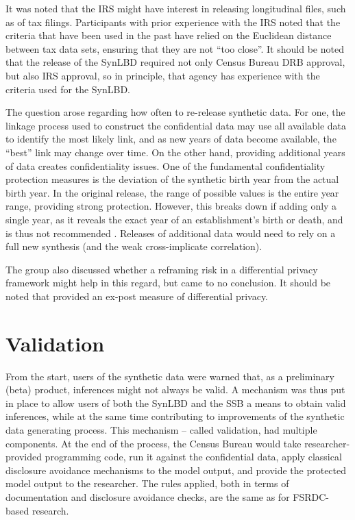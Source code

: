 \documentclass[letterpaper,12pt]{article}
\begin{document}
It was noted that the \ac{IRS} might have interest in releasing longitudinal files, such as of tax filings. Participants with prior experience with the \ac{IRS} noted that the criteria that have been used in the past have relied on the Euclidean distance between tax data sets, ensuring that they are not ``too close''. It should be noted that the release of the SynLBD required not only Census Bureau \ac{DRB} approval, but also \ac{IRS} approval, so in principle, that agency has experience with the criteria used for the SynLBD.


The question arose regarding how often to re-release synthetic data. For one, the linkage process used to construct the confidential data may use all available data to identify the most likely link, and as new years of data become available, the ``best'' link may change over time. On the other hand, providing additional  years of data creates confidentiality issues. One of the fundamental confidentiality protection measures is the deviation of the synthetic birth year from the actual birth year. In the original release, the range of possible values is the entire year range, providing strong protection. However, this breaks down if adding only a single year, as it reveals the exact year of an establishment's birth or death, and is thus not recommended
. Releases of additional data would need to rely on a full new synthesis (and the weak cross-implicate correlation). 

The group also discussed whether a reframing risk in a differential privacy framework might help in this regard, but came to no conclusion. It should be noted that \cite{KinneyEtAl2011} provided an ex-post measure of differential privacy. 


\section{Validation}
\label{sec:validation}


From the start, users of the synthetic data were warned that, as a preliminary (beta) product, inferences might not always be valid. A mechanism was thus put in place to allow users of both the SynLBD and the \ac{SSB} a means to obtain valid inferences, while at the same time contributing to improvements of the synthetic data generating process. This mechanism -- called validation, had multiple components. At the end of the process, the Census Bureau would take researcher-provided programming code, run it against the confidential data, apply classical disclosure avoidance mechanisms to the model output, and provide the protected model output to the researcher. The rules applied, both in terms of documentation and disclosure avoidance checks, are the same as for \ac{FSRDC}-based research. 
\end{document}
